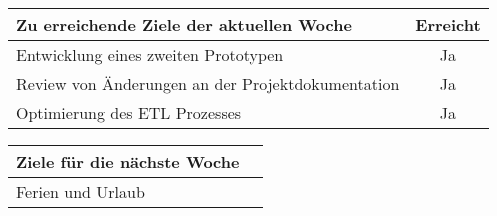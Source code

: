 \begin{tabularx}{\textwidth}{Xc}
    \arrayrulecolor{OliveGreen}
    \toprule
    {\bfseries Zu erreichende Ziele der aktuellen Woche} & {\bfseries Erreicht} \\
    \midrule[2pt]
    Entwicklung eines zweiten Prototypen                 &Ja                    \\
    \rowcolor{OliveGreen!15}
    Review von Änderungen an der Projektdokumentation    &Ja                    \\
    \rowcolor{White}
    Optimierung des ETL Prozesses                        &Ja                    \\
    \bottomrule[2pt]
\end{tabularx}
%
\vspace{1cm}
%
\begin{tabularx}{\textwidth}{Xc}
    \arrayrulecolor{OliveGreen}
    \toprule
    {\bfseries Ziele für die nächste Woche}              &                      \\
    \midrule[2pt]
    Ferien und Urlaub                         &                      \\
\end{tabularx}
